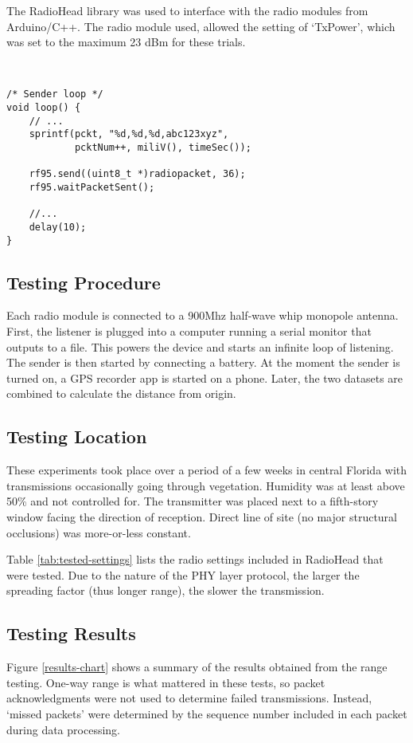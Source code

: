 \documentclass[conference, compsoc]{IEEEtran}
\begin{document}
The RadioHead\cite{radiohead} library was used to interface with the radio modules from Arduino/C++. The radio module used, allowed the setting of `TxPower', which was set to the maximum 23 dBm for these trials.

\

\begin{Verbatim}[fontsize=\small]
/* Sender loop */
void loop() {
    // ...
    sprintf(pckt, "%d,%d,%d,abc123xyz", 
            pcktNum++, miliV(), timeSec());
    
    rf95.send((uint8_t *)radiopacket, 36);
    rf95.waitPacketSent();
    
    //...
    delay(10);
}
\end{Verbatim}

\subsection{Testing Procedure}
Each radio module is connected to a 900Mhz half-wave whip monopole antenna. First, the listener is plugged into a computer running a serial monitor that outputs to a file. This powers the device and starts an infinite loop of listening. The sender is then started by connecting a battery. At the moment the sender is turned on, a GPS recorder app is started on a phone. Later, the two datasets are combined to calculate the distance from origin.

\subsection{Testing Location}
These experiments took place over a period of a few weeks in central Florida with transmissions occasionally going through vegetation. Humidity was at least above 50\% and not controlled for. The transmitter was placed next to a fifth-story window facing the direction of reception. Direct line of site (no major structural occlusions) was more-or-less constant.

Table \ref{tab:tested-settings} lists the radio settings included in RadioHead that were tested. Due to the nature of the PHY layer protocol, the larger the spreading factor (thus longer range), the slower the transmission.

\subsection{Testing Results}
Figure \ref{results-chart} shows a summary of the results obtained from the range testing. One-way range is what mattered in these tests, so packet acknowledgments were not used to determine failed transmissions. Instead, `missed packets' were determined by the sequence number included in each packet during data processing.
\end{document}

